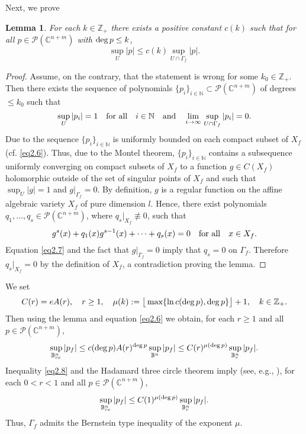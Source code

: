 \documentclass[11pt, oneside]{amsart}
\newtheorem{Lm}[Th]{Lemma}
\begin{document}
Next, we prove
\begin{Lm}\label{lem2.1}
For each $k\in\mathbb Z_+$ there exists a positive constant $c(k)$ such that for all $p\in\mathcal P(\mathbb C^{n+m})$ with ${\rm deg}\,p\le k$,
\[
\sup_U |p|\le c(k)\sup_{U\cap\Gamma_f}|p|.
\]
\end{Lm}
\begin{proof}
Assume, on the contrary, that the statement is wrong for some $k_0\in\mathbb Z_+$. Then there exists the sequence of polynomials $\{p_i\}_{i\in\mathbb N}\subset\mathcal P(\mathbb C^{n+m})$ of degrees $\le k_0$ such that
\[
\sup_U |p_i|=1\quad {\rm for\ all}\quad i\in\mathbb N\quad {\rm and}\quad \lim_{i\rightarrow\infty}\,\sup_{U\cap\Gamma_f}|p_i|=0.
\]
Due to \cite[Th.~2.2]{S} the sequence $\{p_i\}_{i\in\mathbb N}$ is uniformly bounded on each compact subset of $X_f$ (cf. \eqref{eq2.6}). Thus, due to the Montel theorem, $\{p_i\}_{i\in\mathbb N}$ contains a subsequence uniformly converging on compact subsets of $X_f$ to a function $g\in C(X_f)$ holomorphic outside of the set of singular points of $X_f$ and such that $\sup_U |g|=1$ and $g|_{\Gamma_f}=0$. By definition, $g$ is a regular function on the affine algebraic variety $X_f$ of pure dimension $l$. Hence, there exist polynomials $q_1,\dots , q_s\in\mathcal P(\mathbb C^{n+m})$, where $q_s|_{X_f}\not\equiv 0$, such that
\begin{equation}\label{eq2.7}
g^s(x)+q_1(x) g^{s-1}(x)+\cdots + q_s(x)=0\quad {\rm for\ all}\quad x\in X_f.
\end{equation}
Equation \eqref{eq2.7} and the fact that $g|_{\Gamma_f}=0$ imply that $q_s=0$ on $\Gamma_f$. Therefore $q_s|_{X_f}=0$ by the definition of $X_f$, a contradiction proving the lemma.
\end{proof}
We set
\[
C(r)=e A(r),\quad r\ge 1,\quad \mu(k):=\big\lfloor\max\{\ln c({\rm deg}\,p), {\rm deg}\,p\}\big\rfloor +1,\quad k\in\mathbb Z_+.
\]
Then using the lemma and equation \eqref{eq2.6} we obtain, for each $r\ge 1$  and all $p\in\mathcal P(\mathbb C^{n+m})$, 
\begin{equation}\label{eq2.8}
\sup_{\mathbb B^n_{re}} |p_f|\le c({\rm deg}\,p)A(r)^{{\rm deg}\, p}\sup_{\mathbb B^n} |p_f|\le C(r)^{\mu({\rm deg}\,p)}\sup_{\mathbb B_r^n} |p_f|.
\end{equation}
Inequality \eqref{eq2.8} and the Hadamard three circle theorem imply (see, e.g., \cite[Sect.~3.1]{B}),
 for each $0<r<1$ and all $p\in\mathcal P(\mathbb C^{n+m})$, 
 \[
\sup_{\mathbb B^n_{re}} |p_f|\le C(1)^{\mu({\rm deg}\,p)}\sup_{\mathbb B_r^n} |p_f|.
\]
Thus, $\Gamma_f$ admits the Bernstein type inequality of the exponent
$\mu$.\smallskip
\end{document}
